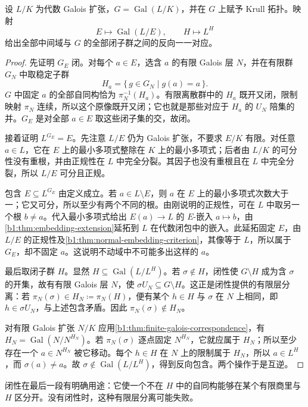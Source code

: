 \begin{theorem}[无限 Galois 对应]\label{b1:thm:infinite-galois-correspondence}
	设 \(L/K\) 为代数 Galois 扩张，\(G=\operatorname{Gal}(L/K)\)，并在 \(G\) 上赋予 Krull 拓扑。映射
	\[
		E\longmapsto\operatorname{Gal}(L/E),\qquad H\longmapsto L^H
	\]
	给出全部中间域与 \(G\) 的全部闭子群之间的反向一一对应。
\end{theorem}
\begin{proof}
	先证明 \(G_E\) 闭。对每个 \(a\in E\)，选含 \(a\) 的有限 Galois 层 \(N\)，并在有限群 \(G_N\) 中取稳定子群
	\[
		H_a=\{\,g\in G_N\mid g(a)=a\,\}.
	\]
	\(G\) 中固定 \(a\) 的全部自同构恰为 \(\pi_N^{-1}(H_a)\)。有限离散群中的 \(H_a\) 既开又闭，限制映射 \(\pi_N\) 连续，所以这个原像既开又闭；它也就是那些对应于 \(H_a\) 的 \(U_N\) 陪集的并。\(G_E\) 是对全部 \(a\in E\) 取这些闭子集的交，故闭。

	接着证明 \(L^{G_E}=E\)。先注意 \(L/E\) 仍为 Galois 扩张，不要求 \(E/K\) 有限。对任意 \(a\in L\)，它在 \(E\) 上的最小多项式整除在 \(K\) 上的最小多项式；后者由 \(L/K\) 的可分性没有重根，并由正规性在 \(L\) 中完全分裂。其因子也没有重根且在 \(L\) 中完全分裂，所以 \(L/E\) 可分且正规。

	包含 \(E\subseteq L^{G_E}\) 由定义成立。若 \(a\in L\setminus E\)，则 \(a\) 在 \(E\) 上的最小多项式次数大于一；它又可分，所以至少有两个不同的根。由刚说明的正规性，可在 \(L\) 中取另一个根 \(b\ne a\)。代入最小多项式给出 \(E(a)\rightarrow L\) 的 \(E\)-嵌入 \(a\mapsto b\)，由\cref{b1:thm:embedding-extension}延拓到 \(L\) 在代数闭包中的嵌入。此延拓固定 \(E\)，由 \(L/E\) 的正规性及\cref{b1:thm:normal-embedding-criterion}，其像等于 \(L\)，所以属于 \(G_E\)，却不固定 \(a\)。这说明不动域中不可能多出这样的 \(a\)。

	最后取闭子群 \(H\)。显然 \(H\subseteq\operatorname{Gal}(L/L^H)\)。若 \(\sigma\notin H\)，闭性使 \(G\setminus H\) 成为含 \(\sigma\) 的开集，故有有限 Galois 层 \(N\)，使 \(\sigma U_N\subseteq G\setminus H\)。这正是闭性提供的有限层分离：若 \(\pi_N(\sigma)\in H_N\coloneqq\pi_N(H)\)，便有某个 \(h\in H\) 与 \(\sigma\) 在 \(N\) 上相同，即 \(h\in\sigma U_N\)，与上述包含矛盾。因此 \(\pi_N(\sigma)\notin H_N\)。

	对有限 Galois 扩张 \(N/K\) 应用\cref{b1:thm:finite-galois-correspondence}，有 \(H_N=\operatorname{Gal}(N/N^{H_N})\)。若 \(\pi_N(\sigma)\) 逐点固定 \(N^{H_N}\)，它就应属于 \(H_N\)；所以至少存在一个 \(a\in N^{H_N}\) 被它移动。每个 \(h\in H\) 在 \(N\) 上的限制属于 \(H_N\)，所以 \(a\in L^H\)，而 \(\sigma(a)\ne a\)。故 \(\sigma\notin\operatorname{Gal}(L/L^H)\)，得到反向包含。两个操作于是互逆。
\end{proof}
闭性在最后一段有明确用途：它使一个不在 \(H\) 中的自同构能够在某个有限商里与 \(H\) 区分开。没有闭性时，这种有限层分离可能失败。

